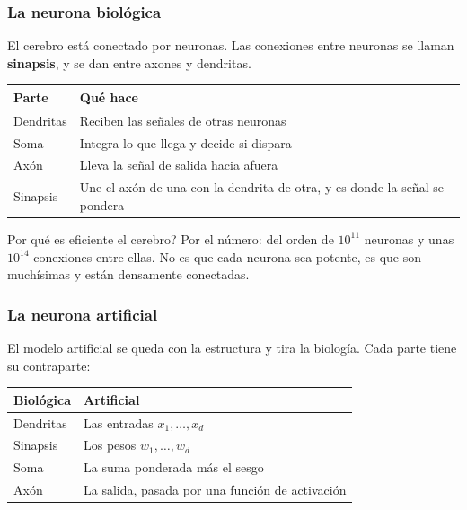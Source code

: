\documentclass[11pt,letterpaper]{article}
\begin{document}
\subsubsection*{La neurona biológica}

El cerebro está conectado por neuronas. Las conexiones entre neuronas
se llaman \textbf{sinapsis}, y se dan entre axones y dendritas.

\begin{center}
\begin{tabular}{ll}
  \toprule
  \textbf{Parte} & \textbf{Qué hace} \\
  \midrule
  Dendritas & Reciben las señales de otras neuronas \\
  Soma      & Integra lo que llega y decide si dispara \\
  Axón      & Lleva la señal de salida hacia afuera \\
  Sinapsis  & Une el axón de una con la dendrita de otra, y es
              donde la señal se pondera \\
  \bottomrule
\end{tabular}
\end{center}

Por qué es eficiente el cerebro? Por el número: del orden de $10^{11}$
neuronas y unas $10^{14}$ conexiones entre ellas. No es que cada
neurona sea potente, es que son muchísimas y están densamente
conectadas.

\subsubsection*{La neurona artificial}

El modelo artificial se queda con la estructura y tira la biología.
Cada parte tiene su contraparte:

\begin{center}
\begin{tabular}{ll}
  \toprule
  \textbf{Biológica} & \textbf{Artificial} \\
  \midrule
  Dendritas & Las entradas $x_1, \ldots, x_d$ \\
  Sinapsis  & Los pesos $w_1, \ldots, w_d$ \\
  Soma      & La suma ponderada más el sesgo \\
  Axón      & La salida, pasada por una función de activación \\
  \bottomrule
\end{tabular}
\end{center}
\end{document}
